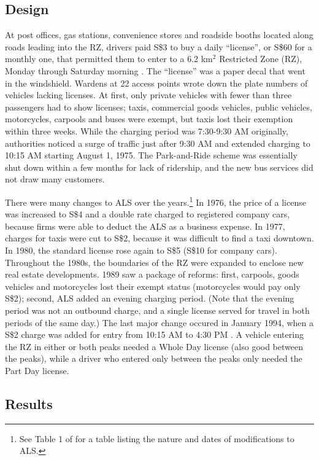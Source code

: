 \subsection{Design}

At post offices, gas stations, convenience stores and roadside booths located along roads leading into the RZ, drivers paid S\$3 to buy a daily ``license'', or S\$60 for a monthly one, that permitted them to enter to a 6.2 km$^{2}$ Restricted Zone (RZ), Monday through Saturday morning \citep{WatsonHolland1978}. The ``license'' was a paper decal that went in the windshield. Wardens at 22 access points wrote down the plate numbers of vehicles lacking licenses. At first, only private vehicles with fewer than three passengers had to show licenses; taxis, commercial goods vehicles, public vehicles, motorcycles, carpools and buses were exempt, but taxis lost their exemption within three weeks. While the charging period was 7:30-9:30 AM originally, authorities noticed a surge of traffic just after 9:30 AM and extended charging to 10:15 AM starting August 1, 1975. The Park-and-Ride scheme was essentially shut down within a few months for lack of ridership, and the new bus services did not draw many customers. 

There were many changes to ALS over the years.\footnote{See Table 1 of \citet[p. 98]{PhangToh1997} for a table listing the nature and dates of modifications to ALS. } In 1976, the price of a license was increased to S\$4 and a double rate charged to registered company cars, because firms were able to deduct the ALS as a business expense. In 1977, charges for taxis were cut to S\$2, because it was difficult to find a taxi downtown. In 1980, the standard license rose again to S\$5 (S\$10 for company cars). Throughout the 1980s, the boundaries of the RZ were expanded to enclose new real estate developments. 1989 saw a package of reforms: first, carpools, goods vehicles and motorcycles lost their exempt status (motorcycles would pay only S\$2); second, ALS added an evening charging period. (Note that the evening period was not an outbound charge, and a single license served for travel in both periods of the same day.) The last major change occured in January 1994, when a S\$2 charge was added for entry from 10:15 AM to 4:30 PM \citep{PhangToh2004}. A vehicle entering the RZ in either or both peaks needed a Whole Day license (also good between the peaks), while a driver who entered only between the peaks only needed the Part Day license. 

\subsection{Results}

